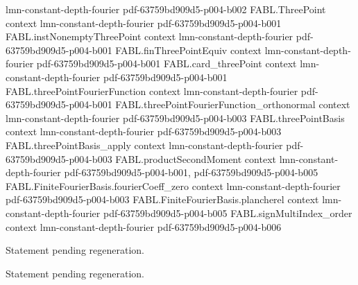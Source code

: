 \begin{theorem}[Parseval]
  {lmn-constant-depth-fourier}
  {pdf-63759bd909d5-p004-b002}
\proofstep
  {FABL.ThreePoint}
  {context}
  {lmn-constant-depth-fourier}
  {pdf-63759bd909d5-p004-b001}
\proofstep
  {FABL.instNonemptyThreePoint}
  {context}
  {lmn-constant-depth-fourier}
  {pdf-63759bd909d5-p004-b001}
\proofstep
  {FABL.finThreePointEquiv}
  {context}
  {lmn-constant-depth-fourier}
  {pdf-63759bd909d5-p004-b001}
\proofstep
  {FABL.card_threePoint}
  {context}
  {lmn-constant-depth-fourier}
  {pdf-63759bd909d5-p004-b001}
\proofstep
  {FABL.threePointFourierFunction}
  {context}
  {lmn-constant-depth-fourier}
  {pdf-63759bd909d5-p004-b001}
\proofstep
  {FABL.threePointFourierFunction_orthonormal}
  {context}
  {lmn-constant-depth-fourier}
  {pdf-63759bd909d5-p004-b003}
\proofstep
  {FABL.threePointBasis}
  {context}
  {lmn-constant-depth-fourier}
  {pdf-63759bd909d5-p004-b003}
\proofstep
  {FABL.threePointBasis_apply}
  {context}
  {lmn-constant-depth-fourier}
  {pdf-63759bd909d5-p004-b003}
\proofstep
  {FABL.productSecondMoment}
  {context}
  {lmn-constant-depth-fourier}
  {pdf-63759bd909d5-p004-b001,
    pdf-63759bd909d5-p004-b005}
\proofstep
  {FABL.FiniteFourierBasis.fourierCoeff_zero}
  {context}
  {lmn-constant-depth-fourier}
  {pdf-63759bd909d5-p004-b003}
\proofstep
  {FABL.FiniteFourierBasis.plancherel}
  {context}
  {lmn-constant-depth-fourier}
  {pdf-63759bd909d5-p004-b005}
\proofstep
  {FABL.signMultiIndex_order}
  {context}
  {lmn-constant-depth-fourier}
  {pdf-63759bd909d5-p004-b006}

Statement pending regeneration.
\end{theorem}

\begin{theorem}
\label{FABL.FiniteFourierBasis.fourierCoeff_centered}
\leanok
{}
Statement pending regeneration.
\end{theorem}

